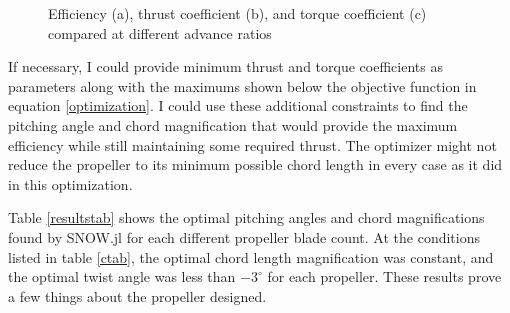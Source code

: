 \documentclass[journal ]{new-aiaa}
\newcounter{ctab}
\begin{document}
\begin{figure}[H]
\centering

	\hspace{1em}
	\caption{Efficiency (a), thrust coefficient (b), and torque coefficient (c) compared at different advance ratios}
	\captionsetup{aboveskip=0pt,font=it}
	\label{efftqtab}
\end{figure}

If necessary, I could provide minimum thrust and torque coefficients as parameters along with the maximums shown below the objective function in equation \eqref{optimization}. I could use these additional constraints to find the pitching angle and chord magnification that would provide the maximum efficiency while still maintaining some required thrust. The optimizer might not reduce the propeller to its minimum possible chord length in every case as it did in this optimization.

Table \eqref{resultstab} shows the optimal pitching angles and chord magnifications found by SNOW.jl for each different propeller blade count. At the conditions listed in table \eqref{ctab}, the optimal chord length magnification was constant, and the optimal twist angle was less than $-3^{\circ}$ for each propeller. These results prove a few things about the propeller designed.
\end{document}
